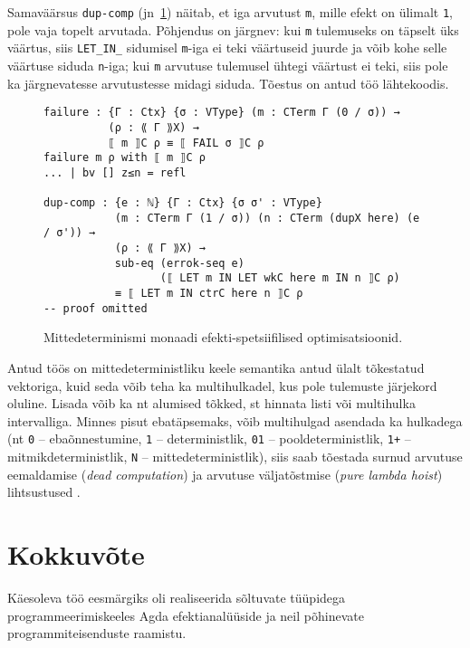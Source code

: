 \documentclass[a4paper,12pt]{article}
\begin{document}
Samaväärsus {\tt dup-comp} (jn~\ref{fig:nd.opt2}) näitab, et iga arvutust {\tt m}, mille efekt on ülimalt {\tt 1}, pole vaja topelt arvutada. Põhjendus on järgnev: kui {\tt m} tulemuseks on täpselt üks väärtus, siis {\tt LET_IN_} sidumisel {\tt m}-iga ei teki väärtuseid juurde ja võib kohe selle väärtuse siduda {\tt n}-iga; kui {\tt m} arvutuse tulemusel ühtegi väärtust ei teki, siis pole ka järgnevatesse arvutustesse midagi siduda. Tõestus on antud töö lähtekoodis.
\begin{figure}
  \begin{BVerbatim}
failure : {Γ : Ctx} {σ : VType} (m : CTerm Γ (0 / σ)) →
          (ρ : ⟪ Γ ⟫X) → 
          ⟦ m ⟧C ρ ≡ ⟦ FAIL σ ⟧C ρ
failure m ρ with ⟦ m ⟧C ρ
... | bv [] z≤n = refl

dup-comp : {e : ℕ} {Γ : Ctx} {σ σ' : VType} 
           (m : CTerm Γ (1 / σ)) (n : CTerm (dupX here) (e / σ')) →
           (ρ : ⟪ Γ ⟫X) → 
           sub-eq (errok-seq e)
                  (⟦ LET m IN LET wkC here m IN n ⟧C ρ)
           ≡ ⟦ LET m IN ctrC here n ⟧C ρ
-- proof omitted
  \end{BVerbatim}
  \caption{Mittedeterminismi monaadi efekti-spetsiifilised optimisatsioonid.}
  \label{fig:nd.opt2}
\end{figure}

Antud töös on mittedeterministliku keele semantika antud ülalt tõkestatud vektoriga,
kuid seda võib teha ka multihulkadel, kus pole tulemuste järjekord oluline.
Lisada võib ka nt alumised tõkked, st hinnata listi või multihulka intervalliga.
Minnes pisut ebatäpsemaks, võib multihulgad asendada ka hulkadega (nt {\tt 0} -- ebaõnnestumine, {\tt 1} -- deterministlik, {\tt 01} -- pooldeterministlik, {\tt 1+} -- mitmikdeterministlik, {\tt N} -- mittedeterministlik), siis saab tõestada surnud arvutuse eemaldamise (\emph{dead computation}) ja arvutuse väljatõstmise (\emph{pure lambda hoist}) lihtsustused \cite{Benton2016}.

\clearpage\vspace*{0pt}


\section{Kokkuvõte}

Käesoleva töö eesmärgiks oli realiseerida sõltuvate tüüpidega programmeerimiskeeles Agda efektianalüüside ja neil põhinevate programmiteisenduste raamistu.
\end{document}
